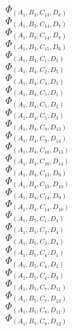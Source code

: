 \documentclass[14pt]{article}
\begin{document}
    $\Phi_{({A}_{1}, {B}_{3}, {C}_{13}, {D}_{8})}$ \\ 
    $\Phi_{({A}_{1}, {B}_{3}, {C}_{14}, {D}_{7})}$ \\ 
    $\Phi_{({A}_{1}, {B}_{3}, {C}_{14}, {D}_{8})}$ \\ 
    $\Phi_{({A}_{1}, {B}_{3}, {C}_{15}, {D}_{6})}$ \\ 
    $\Phi_{({A}_{1}, {B}_{4}, {C}_{1}, {D}_{5})}$ \\ 
    $\Phi_{({A}_{1}, {B}_{4}, {C}_{2}, {D}_{5})}$ \\ 
    $\Phi_{({A}_{1}, {B}_{4}, {C}_{3}, {D}_{5})}$ \\ 
    $\Phi_{({A}_{1}, {B}_{4}, {C}_{5}, {D}_{1})}$ \\ 
    $\Phi_{({A}_{1}, {B}_{4}, {C}_{5}, {D}_{2})}$ \\ 
    $\Phi_{({A}_{1}, {B}_{4}, {C}_{5}, {D}_{3})}$ \\ 
    $\Phi_{({A}_{1}, {B}_{4}, {C}_{9}, {D}_{13})}$ \\ 
    $\Phi_{({A}_{1}, {B}_{4}, {C}_{9}, {D}_{14})}$ \\ 
    $\Phi_{({A}_{1}, {B}_{4}, {C}_{10}, {D}_{13})}$ \\ 
    $\Phi_{({A}_{1}, {B}_{4}, {C}_{10}, {D}_{14})}$ \\ 
    $\Phi_{({A}_{1}, {B}_{4}, {C}_{13}, {D}_{9})}$ \\ 
    $\Phi_{({A}_{1}, {B}_{4}, {C}_{13}, {D}_{10})}$ \\ 
    $\Phi_{({A}_{1}, {B}_{4}, {C}_{14}, {D}_{9})}$ \\ 
    $\Phi_{({A}_{1}, {B}_{4}, {C}_{14}, {D}_{10})}$ \\ 
    $\Phi_{({A}_{1}, {B}_{5}, {C}_{1}, {D}_{4})}$ \\ 
    $\Phi_{({A}_{1}, {B}_{5}, {C}_{2}, {D}_{4})}$ \\ 
    $\Phi_{({A}_{1}, {B}_{5}, {C}_{3}, {D}_{4})}$ \\ 
    $\Phi_{({A}_{1}, {B}_{5}, {C}_{4}, {D}_{1})}$ \\ 
    $\Phi_{({A}_{1}, {B}_{5}, {C}_{4}, {D}_{2})}$ \\ 
    $\Phi_{({A}_{1}, {B}_{5}, {C}_{4}, {D}_{3})}$ \\ 
    $\Phi_{({A}_{1}, {B}_{5}, {C}_{7}, {D}_{11})}$ \\ 
    $\Phi_{({A}_{1}, {B}_{5}, {C}_{7}, {D}_{12})}$ \\ 
    $\Phi_{({A}_{1}, {B}_{5}, {C}_{8}, {D}_{11})}$ \\ 
    $\Phi_{({A}_{1}, {B}_{5}, {C}_{8}, {D}_{12})}$ \\ 
\end{document}
